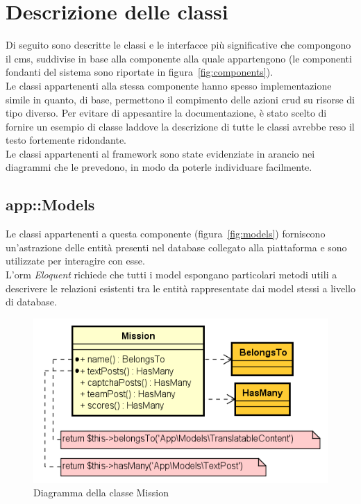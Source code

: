 \section{Descrizione delle classi}
Di seguito sono descritte le classi e le interfacce più significative che compongono il \gls{cms}\glsfirstoccur{}, suddivise in base alla componente alla quale appartengono (le componenti fondanti del sistema sono riportate in figura~\ref{fig:components}). \\
Le classi appartenenti alla stessa componente hanno spesso implementazione simile in quanto, di base, permettono il compimento delle azioni \gls{crud}\glsfirstoccur{} su risorse di tipo diverso. Per evitare di appesantire la documentazione, è stato scelto di fornire un esempio di classe laddove la descrizione di tutte le classi avrebbe reso il testo fortemente ridondante. \\
Le classi appartenenti al framework sono state evidenziate in arancio nei diagrammi che le prevedono, in modo da poterle individuare facilmente.

\subsection{app::Models} %

Le classi appartenenti a questa componente (figura~\ref{fig:models}) forniscono un'astrazione delle entità presenti nel database collegato alla piattaforma e sono utilizzate per interagire con esse. \\
L'\gls{orm}\glsfirstoccur{} \textit{Eloquent} richiede che tutti i model espongano particolari metodi utili a descrivere le relazioni esistenti tra le entità rappresentate dai model stessi a livello di database.

\begin{figure}[H]
	\centering
  \includegraphics[scale=0.7]{immagini/components/mission.png}
  \caption{Diagramma della classe Mission}
	\label{fig:mission} 
\end{figure}

